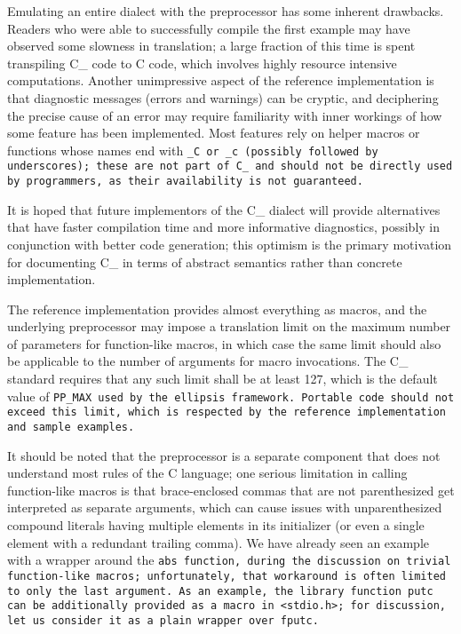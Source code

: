 Emulating an entire dialect with the preprocessor has some inherent drawbacks.
Readers who were able to successfully compile the first
example may have observed some slowness in translation;
a large fraction of this time is spent transpiling C\_ code to C code,
which involves highly resource intensive computations.
Another unimpressive aspect of the reference implementation is
that diagnostic messages (errors and warnings) can be cryptic,
and deciphering the precise cause of an error may require familiarity
with inner workings of how some feature has been implemented.
Most features rely on helper macros or functions whose names end with \tt{_C} or
\tt{_c} (possibly followed by underscores); these are not part of C\_ and should
not be directly used by programmers, as their availability is not guaranteed.

It is hoped that future implementors of the C\_ dialect will provide
alternatives that have faster compilation time and more informative diagnostics,
possibly in conjunction with better code generation;
this optimism is the primary motivation for documenting C\_ in
terms of abstract semantics rather than concrete implementation.

The reference implementation provides almost everything as macros,
and the underlying preprocessor may impose a translation limit on the maximum
number of parameters for function-like macros, in which case the same limit
should also be applicable to the number of arguments for macro invocations.
The C\_ standard requires that any such limit shall be at least 127,
which is the default value of \tt{PP_MAX} used by the ellipsis framework.
Portable code should not exceed this limit,
which is respected by the reference implementation and sample examples.

It should be noted that the preprocessor is a separate
component that does not understand most rules of the C language;
one serious limitation in calling function-like macros is that brace-enclosed
commas that are not parenthesized get interpreted as separate arguments, which
can cause issues with unparenthesized compound literals having multiple elements
in its initializer (or even a single element with a redundant trailing comma).
We have already seen an example with a wrapper around the \tt{abs} function,
during the discussion on trivial function-like macros;
unfortunately, that workaround is often limited to only the last argument.
As an example, the library function \tt{putc} can be
additionally provided as a macro in \tt{<stdio.h>};
for discussion, let us consider it as a plain wrapper over \tt{fputc}.\\

